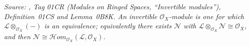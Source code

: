 \begin{definition}\leanok
  \label{def:scheme_modules_isinvertible}
  \textit{Source: \cite{stacks-project}, Tag 01CR (Modules on Ringed Spaces,
  ``Invertible modules''), Definition~01CS and Lemma~0B8K. An invertible
  \(\mathcal{O}_X\)-module is one for which \(\mathcal{L} \otimes_{\mathcal{O}_X}
  (-)\) is an equivalence; equivalently there exists \(\mathcal{N}\) with
  \(\mathcal{L} \otimes_{\mathcal{O}_X} \mathcal{N} \cong \mathcal{O}_X\), and
  then \(\mathcal{N} \cong \mathcal{H}om_{\mathcal{O}_X}(\mathcal{L},
  \mathcal{O}_X)\).}

\end{definition}
